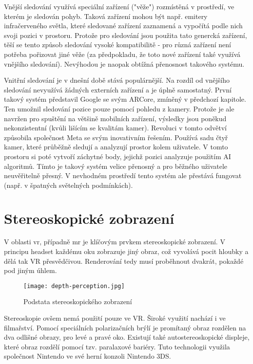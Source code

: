 Vnější sledování využívá speciální zařízení ("věže") rozmístěná v prostředí, ve kterém je sledován pohyb. Taková zařízení mohou být např. emitery infračerveného světla, které sledované zařízení zaznamená a vypočítá podle nich svoji pozici v prostoru. Protože pro sledování jsou použita tato genercká zařízení, těší se tento způsob sledování vysoké kompatibilitě - pro různá zařízení není potřeba pořizovat jiné věže (za předpokladu, že toto nové zařízení také využívá vnějšího sledování). Nevýhodou je naopak obtížná přenosnost takového systému. \cite{vr_tracking_suvi}

Vnitřní sledování je v dnešní době stává populárnější. Na rozdíl od vnějšího sledování nevyužívá žádných externích zařízení a je úplně samostatný. První takový systém představil Google se svým ARCore, zmíněný v předchozí kapitole. Ten umožnil sledování pozice pouze pomocí pohledu z kamery. Protože je ale navržen pro spuštění na většině mobilních zařízení, výsledky jsou poněkud nekonzistentní (kvůli lišícím se kvalitám kamer).
Revoluci v tomto odvětví způsobila společnost Meta se svým inovativním řešením. Používá sadu čtyř kamer, které průběžně sledují a analyzují prostor kolem uživatele. V tomto prostoru si poté vytvoří záchytné body, jejichž pozici analyzuje použitím AI algoritmů. Tímto je takový systém velice přenosný a pro běžného uživatele neuvěřitelně přesný. V nevhodném prostředí tento systém ale přestává fungovat (např. v špatných světelných podmínkách). \cite{vr_tracking_suvi} \cite{enwiki:1182789097}

\section{Stereoskopické zobrazení}

V oblasti \gls{vr}, případně \gls{mr} je klíčovým prvkem stereoskopické zobrazení. V principu headset každému oku zobrazuje jiný obraz, což vyvolává pocit hloubky a dělá tak VR přesvědčivou. Renderování tedy musí proběhnout dvakrát, pokaždé pod jiným úhlem. \cite{stereoskopie_diagram}

\begin{figure}[H]
    \centering
    \texttt{[image: depth-perception.jpg]}
    \caption{Podstata stereoskopického zobrazení \cite{stereoskopie_diagram}}
    \label{depth_perception}
\end{figure}

Stereoskopie ovšem nemá použití pouze ve VR. Široké využití nachází i ve filmařství. Pomocí speciálních polarizačních brýlí je promítaný obraz rozdělen na dva odlišné obrazy, pro levé a pravé oko. \cite{unitedfilm_stereoskopie} Existují také autostereoskopické displeje, které obraz rozdělí pomocí tzv. paralaxové bariéry. Tuto technologii využila společnost Nintendo ve své herní konzoli Nintendo 3DS. \cite{enwiki:1158939127}

